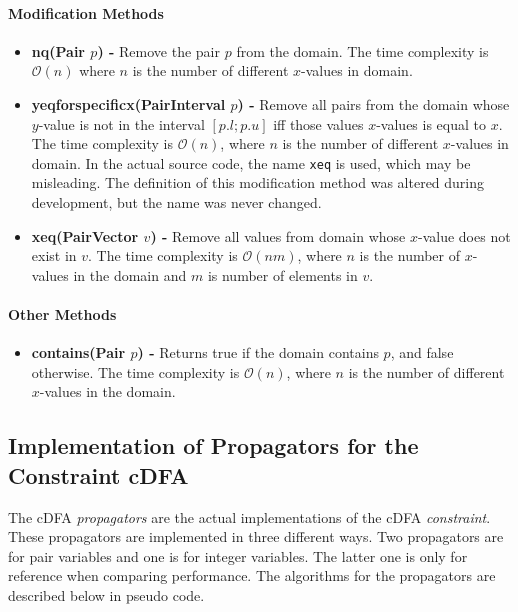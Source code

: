 \documentclass[a4paper,11pt]{article}
\begin{document}
\paragraph{Modification Methods}
\begin{itemize}
\item {\textbf{nq(Pair $p$) - }} Remove the pair $p$ from the domain. The time complexity is $\mathcal{O}(n)$ where $n$ is the number of different $x$-values in domain.

\item{\textbf{yeqforspecificx(PairInterval $p$) - }} Remove all pairs from the domain whose $y$-value is not in the interval $[p.l; p.u]$ iff those values $x$-values is equal to $x$. The time complexity is $\mathcal{O}(n)$, where $n$ is the number of different $x$-values in domain. In the actual source code, the name \texttt{xeq} is used, which may be misleading. The definition of this modification method was altered during development, but the name was never changed.

\item{\textbf{xeq(PairVector $v$) - }} Remove all values from domain whose $x$-value does not exist in $v$. The time complexity is $\mathcal{O}(nm)$, where $n$ is the number of $x$-values in the domain and $m$ is number of elements in $v$.
\end{itemize}

\paragraph{Other Methods}
\begin{itemize}
\item {\textbf{contains(Pair $p$) - }} Returns true if the domain contains $p$, and false otherwise. The time complexity is $\mathcal{O}(n)$, where $n$ is the number of different $x$-values in the domain.
\end{itemize}

\subsection{Implementation of Propagators for the Constraint cDFA}
\label{sec:propimp}
The cDFA \textit{propagators} are the actual implementations of the cDFA \textit{constraint}. These propagators are implemented in three different ways. Two propagators are for pair variables and one is for integer variables. The latter one is only for reference when comparing performance. The algorithms for the propagators are described below in pseudo code.
\end{document}
